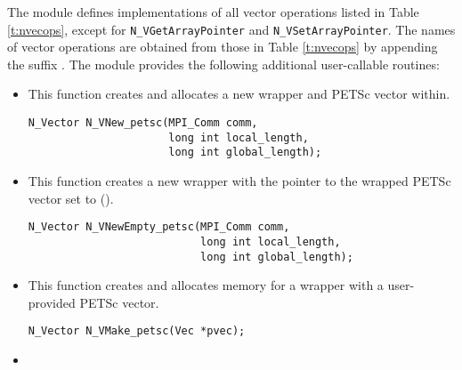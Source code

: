 The {\nvecpetsc} module defines implementations of all vector operations listed 
in Table \ref{t:nvecops}, except for \verb|N_VGetArrayPointer| and 
\verb|N_VSetArrayPointer|. The names of vector operations are obtained from those in 
Table \ref{t:nvecops} by appending the suffix . The module {\nvecpetsc} 
provides the following additional user-callable routines:
\begin{itemize}


\item  {}
  
  This function creates and allocates a new {\nvector} wrapper and PETSc 
  vector within.
 
  

\begin{verbatim}
N_Vector N_VNew_petsc(MPI_Comm comm, 
                      long int local_length, 
                      long int global_length);
\end{verbatim}
  

\item {}
 
  This function creates a new {\nvector} wrapper with the pointer to
  the wrapped PETSc vector set to ().
 
  

\begin{verbatim}
N_Vector N_VNewEmpty_petsc(MPI_Comm comm, 
                           long int local_length, 
                           long int global_length);
\end{verbatim}

  

\item {}
  
  This function creates and allocates memory for a {\nvecpetsc}
  wrapper with a user-provided PETSc vector.
 
  

\begin{verbatim}
N_Vector N_VMake_petsc(Vec *pvec);
\end{verbatim}



\item {}
 

\end{itemize}
